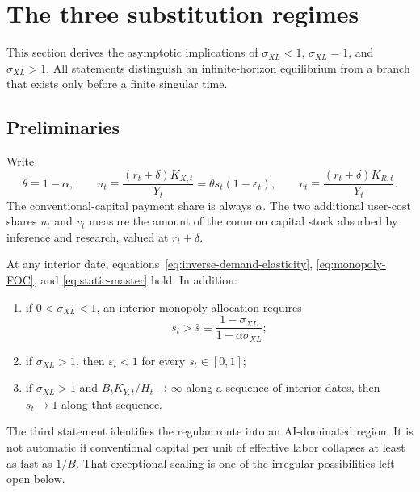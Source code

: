 \section{The three substitution regimes}
\label{sec:regimes}

This section derives the asymptotic implications of $\sigma_{XL}<1$, $\sigma_{XL}=1$, and $\sigma_{XL}>1$. All statements distinguish an infinite-horizon equilibrium from a branch that exists only before a finite singular time.

\subsection{Preliminaries}

Write
\begin{equation}
 \theta\equiv1-\alpha,\qquad
 u_t\equiv\frac{(r_t+\delta)K_{X,t}}{Y_t}
 =\theta s_t(1-\varepsilon_t),\qquad
 v_t\equiv\frac{(r_t+\delta)K_{R,t}}{Y_t}.
 \label{eq:uv-definitions}
\end{equation}
The conventional-capital payment share is always $\alpha$. The two additional user-cost shares $u_t$ and $v_t$ measure the amount of the common capital stock absorbed by inference and research, valued at $r_t+\delta$.

\begin{lemma}
\label{lem:static}
At any interior date, equations~\eqref{eq:inverse-demand-elasticity}, \eqref{eq:monopoly-FOC}, and \eqref{eq:static-master} hold. In addition:
\begin{enumerate}
 \item if $0<\sigma_{XL}<1$, an interior monopoly allocation requires
 \begin{equation}
  s_t>\bar s\equiv
  \frac{1-\sigma_{XL}}{1-\alpha\sigma_{XL}};
  \label{eq:sbar}
 \end{equation}
 \item if $\sigma_{XL}>1$, then $\varepsilon_t<1$ for every $s_t\in[0,1]$;
 \item if $\sigma_{XL}>1$ and
 $B_tK_{Y,t}/H_t\to\infty$ along a sequence of interior dates, then
 $s_t\to1$ along that sequence.
\end{enumerate}
\end{lemma}

The third statement identifies the regular route into an AI-dominated region. It is not automatic if conventional capital per unit of effective labor collapses at least as fast as $1/B$. That exceptional scaling is one of the irregular possibilities left open below.

